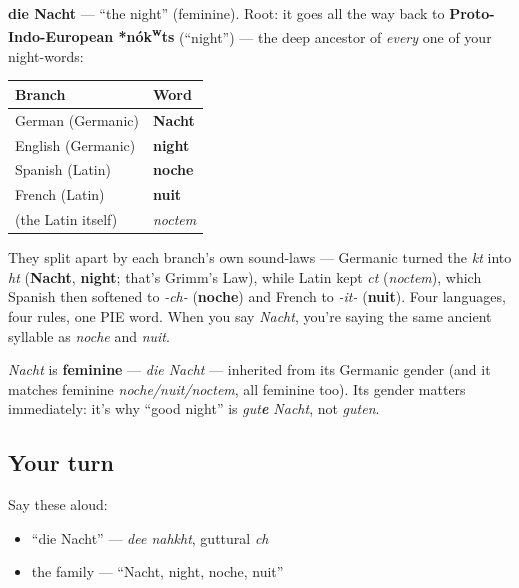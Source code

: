 \begin{cousinweb}
\textbf{die Nacht} — \textquotedblleft{}the night\textquotedblright{} (feminine). Root: it goes all the way back to \textbf{Proto-Indo-European *nók\textsuperscript{w}ts} (\textquotedblleft{}night\textquotedblright{}) — the deep ancestor of \emph{every} one of your night-words:

\noindent
\begin{tabularx}{\linewidth}{@{}>{\raggedright\arraybackslash}X>{\raggedright\arraybackslash}X@{}}
\toprule
\textbf{Branch} & \textbf{Word} \\
\midrule
German (Germanic) & \textbf{Nacht} \\
English (Germanic) & \textbf{night} \\
Spanish (Latin) & \textbf{noche} \\
French (Latin) & \textbf{nuit} \\
(the Latin itself) & \emph{noctem} \\
\bottomrule
\end{tabularx}

They split apart by each branch's own sound-laws — Germanic turned the \emph{kt} into \emph{ht} (\textbf{Nacht}, \textbf{night}; that's Grimm's Law), while Latin kept \emph{ct} (\emph{noctem}), which Spanish then softened to \emph{-ch-} (\textbf{noche}) and French to \emph{-it-} (\textbf{nuit}). Four languages, four rules, one PIE word. When you say \emph{Nacht}, you're saying the same ancient syllable as \emph{noche} and \emph{nuit}.
\end{cousinweb}

\begin{grammarlens}[title={Grammar Lens}]
\emph{Nacht} is \textbf{feminine} — \emph{die Nacht} — inherited from its Germanic gender (and it matches feminine \emph{noche/nuit/noctem}, all feminine too). Its gender matters immediately: it's why \textquotedblleft{}good night\textquotedblright{} is \emph{gut\textbf{e} Nacht}, not \emph{guten}.
\end{grammarlens}

\subsection*{Your turn}
Say these aloud:

\begin{itemize}
\raggedright
  \item \textquotedblleft{}die Nacht\textquotedblright{} — \emph{dee nahkht}, guttural \emph{ch}
  \item the family — \textquotedblleft{}Nacht, night, noche, nuit\textquotedblright{}
\end{itemize}

